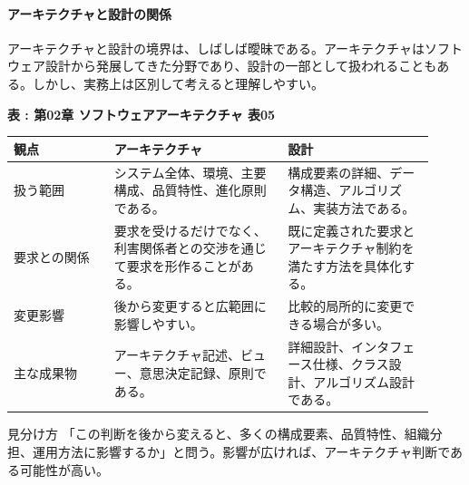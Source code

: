 \paragraph{アーキテクチャと設計の関係}
アーキテクチャと設計の境界は、しばしば曖昧である。アーキテクチャはソフトウェア設計から発展してきた分野であり、設計の一部として扱われることもある。しかし、実務上は区別して考えると理解しやすい。

\par\smallskip\noindent{}\label{tab:ch02-05}\textbf{表 \thetable: 第02章 ソフトウェアアーキテクチャ 表05}\par\smallskip
\begin{longtable}{P{0.22\linewidth}P{0.38\linewidth}P{0.32\linewidth}}
\toprule
観点 & アーキテクチャ & 設計 \\
\midrule
扱う範囲 & システム全体、環境、主要構成、品質特性、進化原則である。 & 構成要素の詳細、データ構造、アルゴリズム、実装方法である。 \\
要求との関係 & 要求を受けるだけでなく、利害関係者との交渉を通じて要求を形作ることがある。 & 既に定義された要求とアーキテクチャ制約を満たす方法を具体化する。 \\
変更影響 & 後から変更すると広範囲に影響しやすい。 & 比較的局所的に変更できる場合が多い。 \\
主な成果物 & アーキテクチャ記述、ビュー、意思決定記録、原則である。 & 詳細設計、インタフェース仕様、クラス設計、アルゴリズム設計である。 \\
\bottomrule
\end{longtable}

\begin{statementbox}{見分け方}
「この判断を後から変えると、多くの構成要素、品質特性、組織分担、運用方法に影響するか」と問う。影響が広ければ、アーキテクチャ判断である可能性が高い。
\end{statementbox}
